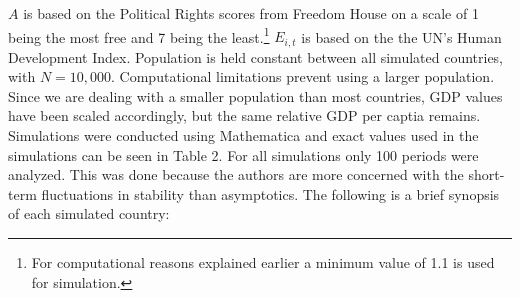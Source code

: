 \documentclass[12pt]{article}
\begin{document}
\begin{spacing}{1.5}
$A$ is based on the Political Rights scores from Freedom House on a scale of 1 being the most free and 7 being the least.\footnote{For computational reasons explained earlier a minimum value of 1.1 is used for simulation.} $E_{i,t}$ is based on the the UN's Human Development Index. Population is held constant between all simulated countries, with $N=10,000$. Computational limitations prevent using a larger population. Since we are dealing with a smaller population than most countries, GDP values have been scaled accordingly, but the same relative GDP per captia remains. Simulations were conducted using Mathematica and exact values used in the simulations can be seen in Table 2. For all simulations only 100 periods were analyzed. This was done because the authors are more concerned with the short-term fluctuations in stability than asymptotics. The following is a brief synopsis of each simulated country:  
 

\end{spacing}
\end{document}
